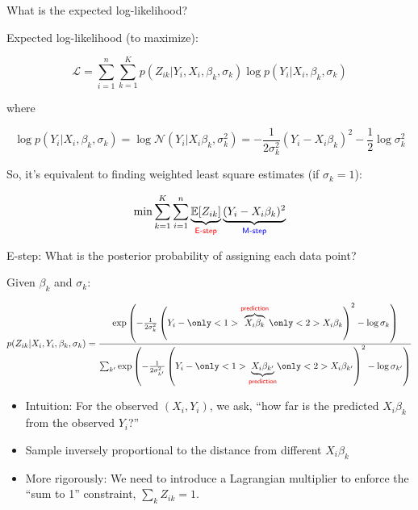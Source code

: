 \documentclass[
  ignorenonframetext,
  aspectratio=169]{beamer}
\begin{document}
\begin{frame}{What is the expected log-likelihood?}
\protect\hypertarget{what-is-the-expected-log-likelihood}{}
\scriptsize

\normalsize

Expected log-likelihood (to maximize):

\[\mathcal{L} = \sum_{i=1}^{n} \sum_{k=1}^{K} p(Z_{ik}|Y_{i}, X_{i}, \beta_{k}, \sigma_{k}) \log p(Y_{i}|X_{i}, \beta_{k}, \sigma_{k})\]

where

\[\log p(Y_{i}|X_{i}, \beta_{k}, \sigma_{k}) 
= \log \mathcal{N}\!\left(Y_{i}|X_{i}\beta_{k},\sigma_{k}^{2}\right)
= 
-\frac{1}{2\sigma_{k}^{2}}(Y_{i} - X_{i} \beta_{k})^{2}
-\frac{1}{2}\log \sigma_{k}^{2}\]

So, it's equivalent to finding weighted least square estimates (if
\(\sigma_{k}=1\)):

\[\min \sum_{k=1}^{K} \sum_{i=1}^{n} \underbrace{\mathbb{E}\!\left[Z_{ik}\right]}_{\textsf{\color{red} E-step}} \underbrace{(Y_{i} - X_{i} \beta_{k})^{2}}_{\textsf{\color{blue} M-step}}\]
\end{frame}

\begin{frame}{E-step: What is the posterior probability of assigning
each data point?}
\protect\hypertarget{e-step-what-is-the-posterior-probability-of-assigning-each-data-point}{}
\scriptsize

\normalsize

\scriptsize

\normalsize

Given \(\beta_{k}\) and \(\sigma_{k}\):

\[p(Z_{ik}|X_{i}, Y_{i}, \beta_{k}, \sigma_{k}) = 
\frac{
\exp\left( - \frac{1}{2\sigma_{k}^{2}} \left(Y_{i} - 
\only<1>{ \overbrace{X_{i} \beta_{k}}^{\textsf{\color{red} prediction}} } 
\only<2>{ X_{i} \beta_{k} }
\right)^{2} - \log \sigma_{k}\right)
}{
\sum_{k'} \exp\left( - \frac{1}{2\sigma_{k'}^{2}} \left(Y_{i} - 
\only<1>{ \underbrace{X_{i} \beta_{k'}}_{\textsf{\color{red} prediction}} } 
\only<2>{ X_{i} \beta_{k'} }
\right)^{2} - \log \sigma_{k'}\right)
}\]

\begin{itemize}
\item
  Intuition: For the observed \((X_{i}, Y_{i})\), we ask, ``how far is
  the predicted \(X_{i}\beta_{k}\) from the observed \(Y_{i}\)?''
\item
  Sample inversely proportional to the distance from different
  \(X_{i}\beta_{k}\)
\item
  More rigorously: We need to introduce a Lagrangian multiplier to
  enforce the ``sum to 1'' constraint, \(\sum_{k} Z_{ik} = 1\).
\end{itemize}
\end{frame}
\end{document}
